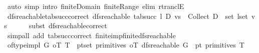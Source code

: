 \begin{isabellebody}
\ {\isacharparenleft}{\kern0pt}auto\ simp{\isacharcolon}{\kern0pt}\ intro{\isacharcolon}{\kern0pt}\ finite{\isacharunderscore}{\kern0pt}Domain\ finite{\isacharunderscore}{\kern0pt}Range\ elim{\isacharcolon}{\kern0pt}\ rtranclE{\isacharparenright}{\kern0pt}\isanewline
\ \ \isamarkupfalse%
%
\endisatagproof
{\isafoldproof}%
%
\isadelimproof
\isanewline
%
\endisadelimproof
\isanewline
{}\isamarkupfalse%
\ dfs{\isacharunderscore}{\kern0pt}reachable{\isacharunderscore}{\kern0pt}tab{\isacharunderscore}{\kern0pt}succ{\isacharunderscore}{\kern0pt}correct{\isacharcolon}{\kern0pt}\ {\isachardoublequoteopen}dfs{\isacharunderscore}{\kern0pt}reachable\ {\isacharparenleft}{\kern0pt}tab{\isacharunderscore}{\kern0pt}succ\ l{\isacharparenright}{\kern0pt}\ D\ vs\ {\isasymlongleftrightarrow}\ Collect\ D\ {\isasyminter}\ {\isacharparenleft}{\kern0pt}set\ l{\isacharparenright}{\kern0pt}\isactrlsup {\isacharasterisk}{\kern0pt}{\isacharbackquote}{\kern0pt}{\isacharbackquote}{\kern0pt}set\ vs\ {\isasymnoteq}\ {\isacharbraceleft}{\kern0pt}{\isacharbraceright}{\kern0pt}{\isachardoublequoteclose}\isanewline
%
\isadelimproof
\ \ %
\endisadelimproof
%
\isatagproof
{}\isamarkupfalse%
\ {\isacharparenleft}{\kern0pt}subst\ dfs{\isacharunderscore}{\kern0pt}reachable{\isacharunderscore}{\kern0pt}correct{\isacharparenright}{\kern0pt}\isanewline
\ \ \isamarkupfalse%
\ {\isacharparenleft}{\kern0pt}simp{\isacharunderscore}{\kern0pt}all\ add{\isacharcolon}{\kern0pt}\ tab{\isacharunderscore}{\kern0pt}succ{\isacharunderscore}{\kern0pt}correct\ finite{\isacharunderscore}{\kern0pt}imp{\isacharunderscore}{\kern0pt}finite{\isacharunderscore}{\kern0pt}dfs{\isacharunderscore}{\kern0pt}reachable{\isacharparenright}{\kern0pt}%
\endisatagproof
{\isafoldproof}%
%
\isadelimproof
%
\endisadelimproof
%
\isadelimdocument
%
\endisadelimdocument
%
\isatagdocument
%
\isamarkuptrue%
%
\isamarkuptrue%
%
\endisatagdocument
{\isafolddocument}%
%
\isadelimdocument
%
\endisadelimdocument
{}\isamarkupfalse%
\ {\isachardoublequoteopen}of{\isacharunderscore}{\kern0pt}type{\isacharunderscore}{\kern0pt}impl\ G\ oT\ T\ {\isasymequiv}\ {\isacharparenleft}{\kern0pt}{\isasymforall}pt{\isasymin}set\ {\isacharparenleft}{\kern0pt}primitives\ oT{\isacharparenright}{\kern0pt}{\isachardot}{\kern0pt}\ dfs{\isacharunderscore}{\kern0pt}reachable\ G\ {\isacharparenleft}{\kern0pt}{\isacharparenleft}{\kern0pt}{\isacharequal}{\kern0pt}{\isacharparenright}{\kern0pt}\ pt{\isacharparenright}{\kern0pt}\ {\isacharparenleft}{\kern0pt}primitives\ T{\isacharparenright}{\kern0pt}{\isacharparenright}{\kern0pt}{\isachardoublequoteclose}\isanewline

\end{isabellebody}
